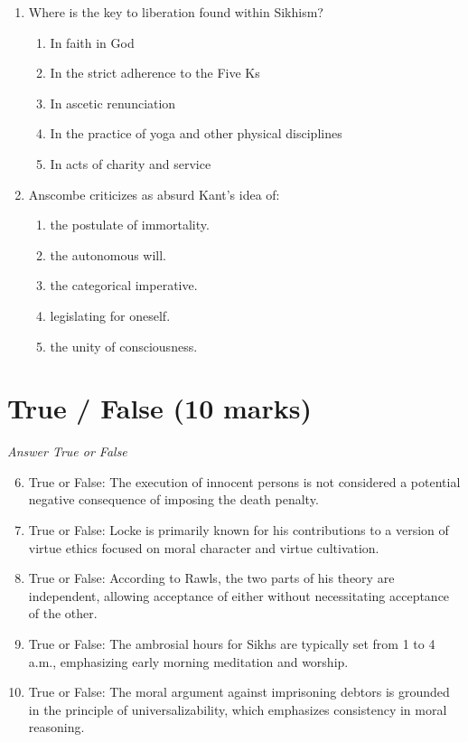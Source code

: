 \documentclass[12pt]{article}
\begin{document}
\begin{enumerate}[label=\arabic*.]
\begin{enumerate}[label=(\alph*)]
\end{enumerate}
\item Where is the key to liberation found within Sikhism?
\begin{enumerate}[label=(\alph*)]
    \item In faith in God
    \item In the strict adherence to the Five Ks
    \item In ascetic renunciation
    \item In the practice of yoga and other physical disciplines
    \item In acts of charity and service
\end{enumerate}
\item Anscombe criticizes as absurd Kant's idea of:
\begin{enumerate}[label=(\alph*)]
    \item the postulate of immortality.
    \item the autonomous will.
    \item the categorical imperative.
    \item legislating for oneself.
    \item the unity of consciousness.
\end{enumerate}
\end{enumerate}

\section*{True / False (10 marks)}
\textit{Answer True or False}
\begin{enumerate}[label=\arabic*.]
\setcounter{enumi}{5}
\item True or False: The execution of innocent persons is not considered a potential negative consequence of imposing the death penalty.
\item True or False: Locke is primarily known for his contributions to a version of virtue ethics focused on moral character and virtue cultivation.
\item True or False: According to Rawls, the two parts of his theory are independent, allowing acceptance of either without necessitating acceptance of the other.
\item True or False: The ambrosial hours for Sikhs are typically set from 1 to 4 a.m., emphasizing early morning meditation and worship.
\item True or False: The moral argument against imprisoning debtors is grounded in the principle of universalizability, which emphasizes consistency in moral reasoning.
\end{enumerate}
\end{document}
